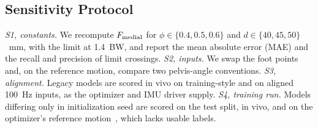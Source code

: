 \subsection{Sensitivity Protocol}\label{sec:sens}
\textit{S1, constants.} We recompute $F_{\mathrm{medial}}$ for $\phi \in \{0.4, 0.5, 0.6\}$ and
$d \in \{40, 45, 50\}$~mm, with the limit at 1.4~BW, and report the mean absolute error (MAE) and
the recall and precision of limit crossings. \textit{S2, inputs.} We swap the foot points and, on
the reference motion, compare two pelvis-angle conventions. \textit{S3, alignment.} Legacy models
are scored in vivo on training-style and on aligned 100~Hz inputs, as the optimizer and IMU
driver supply. \textit{S4, training run.} Models differing only in initialization seed are
scored on the test split, in vivo, and on the optimizer's reference motion~\citeChong{},
which lacks usable labels.

